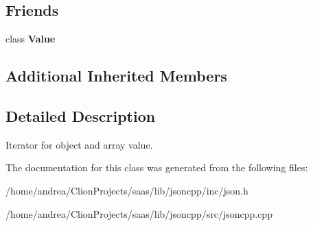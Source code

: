 \subsection*{Friends}
\begin{DoxyCompactItemize}
\item 
class {\bfseries Value}\hypertarget{class_json_1_1_value_iterator_aeceedf6e1a7d48a588516ce2b1983d6f}{}\label{class_json_1_1_value_iterator_aeceedf6e1a7d48a588516ce2b1983d6f}

\end{DoxyCompactItemize}
\subsection*{Additional Inherited Members}


\subsection{Detailed Description}
Iterator for object and array value. 

The documentation for this class was generated from the following files\+:\begin{DoxyCompactItemize}
\item 
/home/andrea/\+Clion\+Projects/saas/lib/jsoncpp/inc/json.\+h\item 
/home/andrea/\+Clion\+Projects/saas/lib/jsoncpp/src/jsoncpp.\+cpp\end{DoxyCompactItemize}
